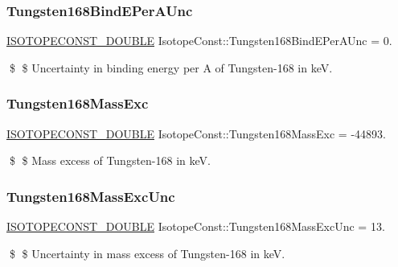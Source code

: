 \subsubsection{\texorpdfstring{Tungsten168\+Bind\+E\+Per\+A\+Unc}{Tungsten168BindEPerAUnc}}
{\footnotesize\ttfamily \mbox{\hyperlink{group___isotope_const-_macros_ga8f45a7272ce02c0b4c65c44636ed719a}{I\+S\+O\+T\+O\+P\+E\+C\+O\+N\+S\+T\+\_\+\+D\+O\+U\+B\+LE}} Isotope\+Const\+::\+Tungsten168\+Bind\+E\+Per\+A\+Unc = 0.}

\$ \$ Uncertainty in binding energy per A of Tungsten-\/168 in keV. \mbox{\label{group___isotope_const-_tungsten-_w168_ga9f58b04ec72898d05c004d360ab0f7d4}} 
\subsubsection{\texorpdfstring{Tungsten168\+Mass\+Exc}{Tungsten168MassExc}}
{\footnotesize\ttfamily \mbox{\hyperlink{group___isotope_const-_macros_ga8f45a7272ce02c0b4c65c44636ed719a}{I\+S\+O\+T\+O\+P\+E\+C\+O\+N\+S\+T\+\_\+\+D\+O\+U\+B\+LE}} Isotope\+Const\+::\+Tungsten168\+Mass\+Exc = -\/44893.}

\$ \$ Mass excess of Tungsten-\/168 in keV. \mbox{\label{group___isotope_const-_tungsten-_w168_gacffc18d212a93e5b9f88748058dc67c6}} 
\subsubsection{\texorpdfstring{Tungsten168\+Mass\+Exc\+Unc}{Tungsten168MassExcUnc}}
{\footnotesize\ttfamily \mbox{\hyperlink{group___isotope_const-_macros_ga8f45a7272ce02c0b4c65c44636ed719a}{I\+S\+O\+T\+O\+P\+E\+C\+O\+N\+S\+T\+\_\+\+D\+O\+U\+B\+LE}} Isotope\+Const\+::\+Tungsten168\+Mass\+Exc\+Unc = 13.}

\$ \$ Uncertainty in mass excess of Tungsten-\/168 in keV. \mbox{\label{group___isotope_const-_tungsten-_w168_ga51b192e5a33898025f3cd1e47bf5ec7d}} 
